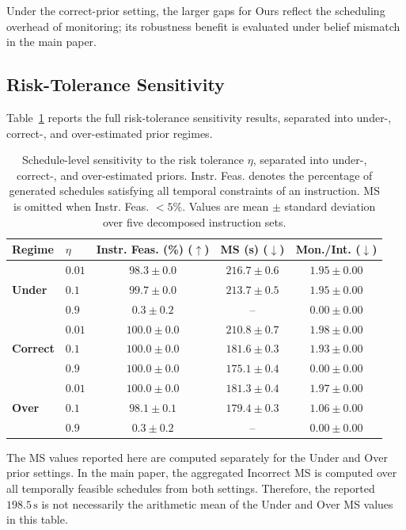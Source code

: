 \documentclass[letterpaper,10pt,onecolumn]{IEEEtran}
\begin{document}
Under the correct-prior setting, the larger gaps for Ours reflect the scheduling overhead of monitoring; its robustness benefit is evaluated under belief mismatch in the main paper.

\subsection{Risk-Tolerance Sensitivity}\label{supp:eta}
Table~\ref{tab:supp_eta} reports the full risk-tolerance sensitivity results,
separated into under-, correct-, and over-estimated prior regimes.
\begin{table}[H]
\centering
\caption{Schedule-level sensitivity to the risk tolerance $\eta$, separated
into under-, correct-, and over-estimated priors. Instr. Feas. denotes the
percentage of generated schedules satisfying all temporal constraints of an
instruction. MS is omitted when Instr. Feas. $<5\%$. Values are mean $\pm$
standard deviation over five decomposed instruction sets.}
\label{tab:supp_eta}
{\small
\setlength{\tabcolsep}{3.0pt}
\begin{tabular}{@{}llccc@{}}
\toprule
\textbf{Regime} & $\eta$ & \textbf{Instr. Feas. (\%)} ($\uparrow$) & \textbf{MS (s)} ($\downarrow$) & \textbf{Mon./Int.} ($\downarrow$) \\
\midrule
\multirow{3}{*}{\textbf{Under}}
 & $0.01$ & $98.3 \pm 0.0$  & $216.7 \pm 0.6$ & $1.95 \pm 0.00$ \\
 & $0.1$  & $99.7 \pm 0.0$  & $213.7 \pm 0.5$ & $1.95 \pm 0.00$ \\
 & $0.9$  & $0.3 \pm 0.2$   & --              & $0.00 \pm 0.00$ \\
\midrule
\multirow{3}{*}{\textbf{Correct}}
 & $0.01$ & $100.0 \pm 0.0$ & $210.8 \pm 0.7$ & $1.98 \pm 0.00$ \\
 & $0.1$  & $100.0 \pm 0.0$ & $181.6 \pm 0.3$ & $1.93 \pm 0.00$ \\
 & $0.9$  & $100.0 \pm 0.0$ & $175.1 \pm 0.4$ & $0.00 \pm 0.00$ \\
\midrule
\multirow{3}{*}{\textbf{Over}}
 & $0.01$ & $100.0 \pm 0.0$ & $181.3 \pm 0.4$ & $1.97 \pm 0.00$ \\
 & $0.1$  & $98.1 \pm 0.1$  & $179.4 \pm 0.3$ & $1.06 \pm 0.00$ \\
 & $0.9$  & $0.3 \pm 0.2$   & --              & $0.00 \pm 0.00$ \\
\bottomrule
\end{tabular}
}
\end{table}
The MS values reported here are computed separately for the Under and Over prior settings. In the main paper, the aggregated Incorrect MS is computed over all temporally feasible schedules from both settings. Therefore, the reported \(198.5\,\mathrm{s}\) is not necessarily the arithmetic mean of the Under and Over MS values in this table.
\end{document}
